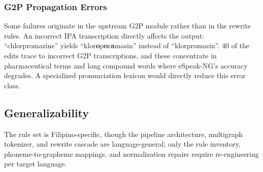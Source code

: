\subsubsection{G2P Propagation Errors}

Some failures originate in the upstream G2P module rather than in the rewrite
rules. An incorrect IPA transcription directly affects the output:
``chlorpromazine'' yields ``klor\textbf{o}p\textbf{o}r\textbf{a}masin'' instead
of ``klorpromasin''. 40 of the edits trace to incorrect G2P transcriptions, and
these concentrate in pharmaceutical terms and long compound words where
eSpeak-NG's accuracy degrades. A specialized pronunciation lexicon would
directly reduce this error class.

\subsection{Generalizability}

The rule set is Filipino-specific, though the pipeline architecture, multigraph
tokenizer, and rewrite cascade are language-general; only the rule inventory,
phoneme-to-grapheme mappings, and normalization repairs require re-engineering
per target language.
